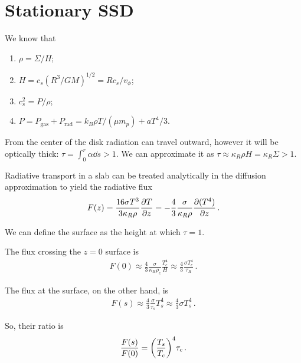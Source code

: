 \documentclass[main.tex]{subfiles}
\begin{document}
\section{Stationary SSD}


We know that \begin{enumerate}
    \item \(\rho = \Sigma / H\);
    \item \(H = c_s (R^3 / GM)^{1/2} = R c_s / v_\phi \);
    \item \(c_s^2 = P / \rho \);
    \item \(P = P _{\text{gas}} + P _{\text{rad}} = k_B \rho T / (\mu m_p) + a T^{4} / 3\).
\end{enumerate}

From the center of the disk radiation can travel outward, however it will be optically thick: \(\tau = \int_{0}^{r} \alpha \dd{s} >1\).
We can approximate it as \(\tau \approx \kappa _R \rho H = \kappa _R \Sigma > 1\).

Radiative transport in a slab can be treated analytically in the diffusion approximation to yield the radiative flux 
%
\begin{align}
F(z) = \frac{16 \sigma T^3}{3 \kappa _R \rho } \pdv{T}{z} = - \frac{4}{3} \frac{\sigma}{\kappa _R \rho } \pdv{(T^{4})}{z}
\,.
\end{align}

We can define the surface as the height at which \(\tau =1\).

The flux crossing the \(z = 0\) surface is 
%
\begin{align}
F(0) \approx \frac{4}{3} \frac{\sigma }{\kappa _R \rho _c} \frac{T_c^{4}}{H} \approx \frac{4}{3} \frac{\sigma T_c^{4}}{\tau _R}
\,.
\end{align}


The flux at the surface, on the other hand, is
%
\begin{align}
F(s) \approx \frac{4}{3} \frac{\sigma}{\tau _s} T_s^{4} \approx \frac{4}{3} \sigma T_s^{4}
\,.
\end{align}

So, their ratio is 
%
\begin{align}
\frac{F(s)}{F(0)} = \qty(\frac{T_s}{T_c})^{4} \tau _c 
\,.
\end{align}
\end{document}
